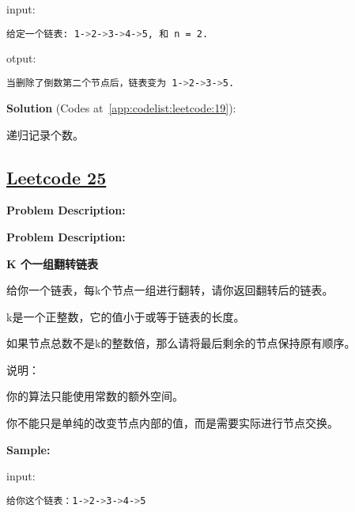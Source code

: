 input:\par

\begin{lstlisting}[language=bash]
给定一个链表: 1->2->3->4->5, 和 n = 2.
\end{lstlisting}

otput:\par

\begin{lstlisting}[language=bash]
当删除了倒数第二个节点后，链表变为 1->2->3->5.
\end{lstlisting}

\textbf{Solution }(Codes at~\ref{app:codelist:leetcode:19}):\par

递归记录个数。\par



\subsection{\href{https://leetcode-cn.com/}{Leetcode 25}}\label{app:problemlist:leetcode:25}

\textbf{Problem Description:}\par

\textbf{Problem Description:}\par

\textbf{K 个一组翻转链表}\par

给你一个链表，每k个节点一组进行翻转，请你返回翻转后的链表。\par

k是一个正整数，它的值小于或等于链表的长度。\par

如果节点总数不是k的整数倍，那么请将最后剩余的节点保持原有顺序。\par

说明：\par

你的算法只能使用常数的额外空间。\par

你不能只是单纯的改变节点内部的值，而是需要实际进行节点交换。\par


\textbf{Sample:}\par

input:\par

\begin{lstlisting}[language=bash]
给你这个链表：1->2->3->4->5
\end{lstlisting}

